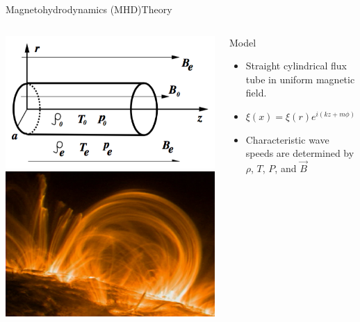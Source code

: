 \documentclass[11pt,table]{beamer}
\begin{document}
\begin{frame}{Magnetohydrodynamics (MHD)}{Theory}
    \begin{columns}
        \includegraphics[width=\textwidth]{cylinder.png}\\
        \includegraphics[width=\textwidth]{loop.jpg}
        \begin{block}{Model}
            \begin{itemize}
                \item Straight cylindrical flux tube in uniform magnetic field.
                \item $ \xi(x) = \xi(r)e^{i(kz+m{\phi})} $
                \item Characteristic wave speeds are determined by
                    $\rho$, $T$, $P$, and $\vec{B}$
            \end{itemize}

\end{block}
\end{columns}
\end{frame}
\end{document}
